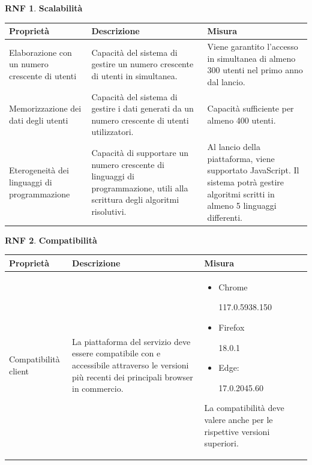 \documentclass[11pt, a4paper]{article}
\theoremstyle{definition} %
\newtheorem{nonfuncreq}{RNF} %
\begin{document}
\begin{nonfuncreq}
\textbf{Scalabilità }
\begin{center}
    \footnotesize
    \begin{tabularx}{\textwidth}{|X||X||X|}
        \hline
        \cellcolor{red!70}Proprietà & \cellcolor{red!70}Descrizione & \cellcolor{red!70}Misura\\
        \hline
        Elaborazione con un numero crescente di utenti & Capacità del sistema di gestire un numero crescente di utenti in simultanea. & Viene garantito l'accesso in simultanea di almeno 300 utenti nel primo anno dal lancio.\\
        \hline
        Memorizzazione dei dati degli utenti & Capacità del sistema di gestire i dati generati da un numero crescente di utenti utilizzatori. & Capacità sufficiente per almeno 400 utenti.\\
        \hline
        Eterogeneità dei linguaggi di programmazione & Capacità di supportare un numero crescente di linguaggi di programmazione, utili alla scrittura degli algoritmi risolutivi. & Al lancio della piattaforma, viene supportato JavaScript. Il sistema potrà gestire algoritmi scritti in almeno 5 linguaggi differenti.\\
        \hline
    \end{tabularx}
\end{center}
\end{nonfuncreq}

\begin{nonfuncreq}
    \textbf{Compatibilità }
    \begin{center}
        \footnotesize
        \begin{tabularx}{\textwidth}{|X||X||X|}
            \hline
            \cellcolor{red!70}Proprietà & \cellcolor{red!70}Descrizione & \cellcolor{red!70}Misura\\
            \hline
            Compatibilità client & La piattaforma del servizio deve essere compatibile con e accessibile attraverso le versioni più recenti dei principali browser in commercio. &
            \begin{itemize}
                \item Chrome

                117.0.5938.150
                \item Firefox

                18.0.1
                \item Edge:

                17.0.2045.60
            \end{itemize}La compatibilità deve valere anche per le rispettive versioni superiori.\\
            \hline
        \end{tabularx}
    \end{center}
\end{nonfuncreq}
\end{document}
